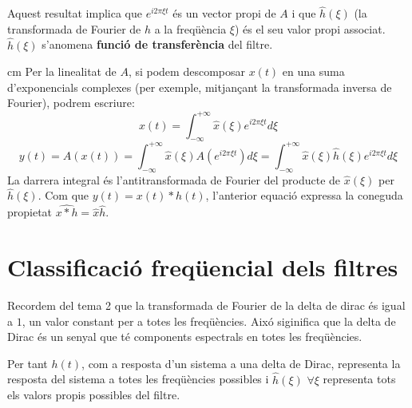\documentclass{article}
\begin{document}
Aquest resultat implica que $e^{i 2 \pi \xi t}$ \'es un vector propi de $A$ i que $\hat{h}(\xi)$ 
(la transformada de Fourier de $h$ a la freq\"u\`encia $\xi$) \'es el seu valor propi associat.
$\hat{h}(\xi)$ s'anomena {\bf funci\'o de transfer\`encia} del filtre.

 cm
Per la linealitat de $A$, si podem descomposar $x(t)$ en una suma d'exponencials complexes 
(per exemple, mitjan\c{c}ant la transformada inversa de Fourier), podrem escriure:
\[
x(t)=\int_{-\infty}^{+\infty} \hat{x}(\xi) e^{i 2 \pi \xi t} d\xi
\]
\[
y(t)=A(x(t)) = \int_{-\infty}^{+\infty} \hat{x}(\xi) A(e^{i 2 \pi \xi t}) d\xi = 
\int_{-\infty}^{+\infty} \hat{x}(\xi) \hat{h}(\xi) e^{i 2 \pi \xi t} d\xi
\]
La darrera integral \'es l'antitransformada de Fourier del producte de $\hat{x}(\xi)$ per
$\hat{h}(\xi)$. Com que $y(t)=x(t)*h(t)$, l'anterior equaci\'o expressa la coneguda propietat
$\widehat{x*h}=\hat{x}\hat{h}$.

\section{Classificaci\'o freq\"uencial dels filtres}
Recordem del tema 2 que la transformada de Fourier de la delta de dirac \'es igual a $1$, un 
valor constant per a totes les freq\"u\`encies. Aix\'o siginifica que la delta de Dirac
\'es un senyal que t\'e components espectrals en totes les freq\"u\`encies.

Per tant $h(t)$, com a resposta d'un sistema a una delta de Dirac, representa la resposta
del sistema a totes les freq\"u\`encies possibles i $\hat{h}(\xi)$ $\forall \xi$ representa tots 
els valors propis possibles del filtre. 
\end{document}
